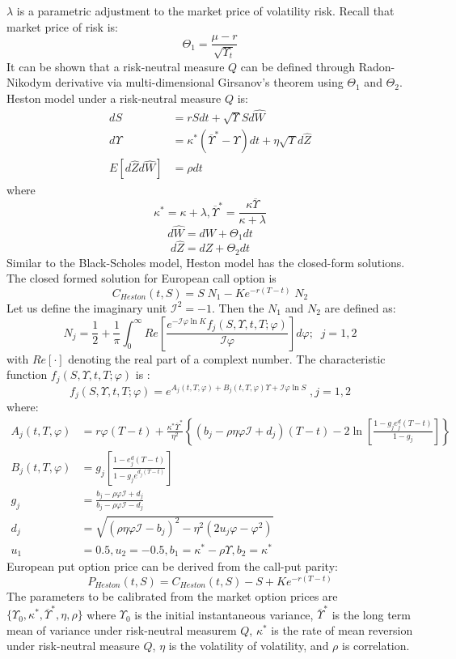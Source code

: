 \documentclass[letterpaper,12pt,titlepage,oneside,final]{book}
\numberwithin{equation}{section}
\theoremstyle{definition}
\begin{document}
$\lambda$ is a parametric adjustment to the market price of volatility risk.
Recall that market price of risk is:
\[
\Theta_1=\frac{\mu-r}{\sqrt{\Upsilon_t}}
\]
It can be shown that a risk-neutral measure $Q$ can be defined through Radon-Nikodym derivative via multi-dimensional Girsanov's theorem \cite{shreve2004stochastic} using  $\Theta_1$ and $\Theta_2$. Heston model under a risk-neutral measure $Q$ is:
\begin{equation}
\begin{split}
dS&=r S dt + \sqrt{\Upsilon} S d\hat{W}\\
d\Upsilon&=\kappa^*(\overline{\Upsilon}^*-\Upsilon)dt+\eta \sqrt{\Upsilon}d\hat{Z}\\
E[d\hat{Z}d\hat{W}]&=\rho dt
\end{split}
\label{eq:hestonNeutral}
\end{equation}
where
\[
\kappa^*=\kappa+\lambda, \overline{\Upsilon}^*=\frac{\kappa \overline{\Upsilon}}{\kappa+\lambda}
\]
\[
d\hat{W}=dW+\Theta_1 dt
\]
\[
d\hat{Z}=dZ+\Theta_2 dt
\]
Similar to the Black-Scholes model, Heston model has the closed-form solutions. The closed formed solution for European call option is
\begin{equation}
	\label{eq:hestonPrice}
C_{Heston}(t,S)=S\; N_1-Ke^{-r(T-t)} \; N_2
\end{equation}
Let us define the imaginary unit $\mathcal{I}^2=-1$. Then the $N_1$ and $N_2$ are defined as:
\[
N_j=\frac{1}{2}+\frac{1}{\pi}\int_{0}^{\infty} Re \left[\frac{e^{-\mathcal{I} \varphi \ln{K}} f_j(S,\Upsilon,t,T;\varphi)} {\mathcal{I}\varphi} \right] d\varphi;\;\; j=1,2
\] with $Re[\cdot]$ denoting the real part of a complext number.
The characteristic function $f_j(S,\Upsilon,t,T;\varphi)$ is :
\[
f_j(S,\Upsilon,t,T;\varphi)=e^{A_j(t,T,\varphi)+B_j(t,T,\varphi)\Upsilon+\mathcal{I} \varphi \ln{S}}\;, j=1,2
\]
where:
\[
\begin{split}
A_j(t,T,\varphi)&=r \varphi (T-t)+ \frac{\kappa^* \overline{\Upsilon}^*}{\eta^2}\left\{(b_j-\rho \eta \varphi \mathcal{I}+ d_j) (T-t)- 2\ln{\left[ \frac{1-g_je^d_j(T-t)}{1-g_j}\right]}     \right\}\\
B_j(t,T,\varphi)&=g_j\left[ \frac{1-e^d_j(T-t)}{1-g_je^{d_j(T-t)}}\right] \\
g_j&=\frac{b_j-\rho\varphi \mathcal{I}+d_j}{b_j-\rho\varphi \mathcal{I}-d_j}\\
d_j&=\sqrt{(\rho \eta \varphi \mathcal{I}-b_j)^2-\eta^2(2 u_j \varphi- \varphi^2)}\\
u_1&=0.5, u_2=-0.5, b_1=\kappa^*-\rho \Upsilon, b_2=\kappa^*
\end{split}
\]
European put option price can be derived from the call-put parity:
\[
P_{Heston}(t,S)=C_{Heston}(t,S)-S+K e^{-r(T-t)}
\]
The parameters to be calibrated from the market option prices are $\{\Upsilon_0,\kappa^*,\overline{\Upsilon}^*,\eta,\rho\}$ where $\Upsilon_0$ is the initial instantaneous variance, $\overline{\Upsilon}^*$ is the long term mean of variance under risk-neutral measurem $Q$, $\kappa^*$ is the rate of mean reversion under risk-neutral measure $Q$, $\eta$ is the volatility of volatility, and $\rho$ is correlation.
\end{document}
